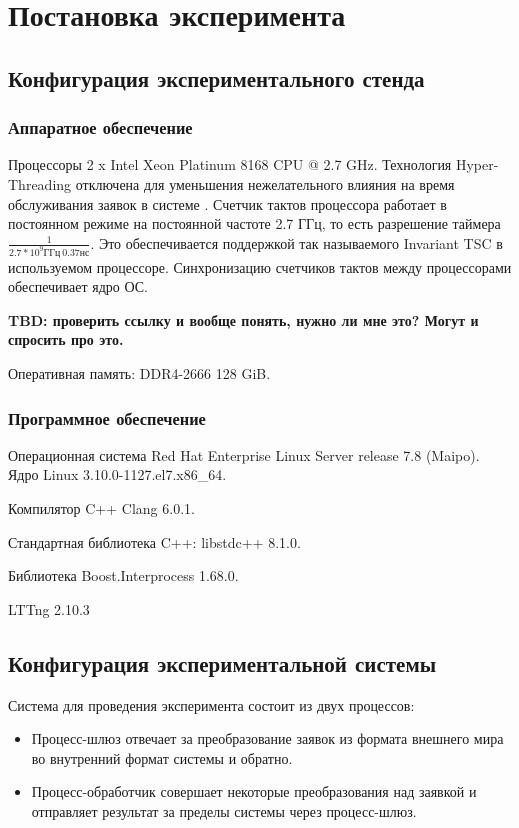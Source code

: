 \section{Постановка эксперимента}

\subsection{Конфигурация экспериментального стенда}

\subsubsection{Аппаратное обеспечение}

Процессоры 2 x Intel Xeon Platinum 8168 CPU @ 2.7 GHz.
Технология Hyper-Threading отключена для уменьшения нежелательного влияния на время обслуживания заявок в системе \cite{LowLatencyHT}.
Счетчик тактов процессора работает в постоянном режиме на постоянной частоте 2.7 ГГц, то есть разрешение таймера $\frac{1}{2.7 * 10 ^ 9 \text{ГГц}  ~ 0.37 нс}$. Это обеспечивается поддержкой так называемого Invariant TSC \cite[153]{IntelManual} в используемом процессоре. Синхронизацию счетчиков тактов между процессорами обеспечивает ядро ОС.

\textbf{TBD: проверить ссылку и вообще понять, нужно ли мне это? Могут и спросить про это.}

Оперативная память: DDR4-2666 128 GiB.

\subsubsection{Программное обеспечение}

Операционная система Red Hat Enterprise Linux Server release 7.8 (Maipo).
Ядро Linux 3.10.0-1127.el7.x86\_64.

Компилятор C++ Clang 6.0.1.

Стандартная библиотека C++: libstdc++ 8.1.0.

Библиотека Boost.Interprocess 1.68.0.

LTTng 2.10.3

\subsection{Конфигурация экспериментальной системы}

Система для проведения эксперимента состоит из двух процессов:
\begin{itemize}
\item Процесс-шлюз отвечает за преобразование заявок из формата внешнего мира во внутренний формат системы и обратно. 
\item Процесс-обработчик совершает некоторые преобразования над заявкой и отправляет результат за пределы системы через процесс-шлюз.
\end{itemize}

